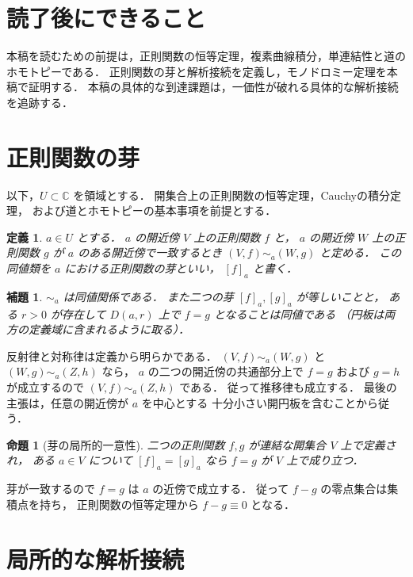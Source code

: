 \documentclass[a5paper,10pt,onecolumn]{jsarticle}
\makeatletter
\theoremstyle{mathnotetheorem}
\newtheorem{definition}[theorem]{定義}
\newtheorem{lemma}[theorem]{補題}
\newtheorem{proposition}[theorem]{命題}
\renewcommand{\proofname}{証明}
\renewenvironment{proof}[1][\proofname]{%
  \par\pushQED{\qed}\normalfont\topsep4\p@\@plus2\p@\relax
  \trivlist\item[\hskip\labelsep\bfseries #1]\ignorespaces
}{\popQED\endtrivlist\@endpefalse}
\makeatother
\begin{document}
\section*{読了後にできること}
本稿を読むための前提は，正則関数の恒等定理，複素曲線積分，単連結性と道のホモトピーである．
正則関数の芽と解析接続を定義し，モノドロミー定理を本稿で証明する．
本稿の具体的な到達課題は，一価性が破れる具体的な解析接続を追跡する．

\section{正則関数の芽}

以下，$U\subset\mathbb C$ を領域とする．
開集合上の正則関数の恒等定理，Cauchyの積分定理，
および道とホモトピーの基本事項を前提とする．

\begin{definition}
$a\in U$ とする．
$a$ の開近傍 $V$ 上の正則関数 $f$ と，
$a$ の開近傍 $W$ 上の正則関数 $g$ が
$a$ のある開近傍で一致するとき
$(V,f)\sim_a(W,g)$ と定める．
この同値類を $a$ における\emph{正則関数の芽}といい，
$[f]_a$ と書く．
\end{definition}

\begin{lemma}\label{lem:germ}
$\sim_a$ は同値関係である．
また二つの芽 $[f]_a,[g]_a$ が等しいことと，
ある $r>0$ が存在して
$D(a,r)$ 上で $f=g$ となることは同値である
（円板は両方の定義域に含まれるように取る）．
\end{lemma}
\begin{proof}
反射律と対称律は定義から明らかである．
$(V,f)\sim_a(W,g)$ と
$(W,g)\sim_a(Z,h)$ なら，
$a$ の二つの開近傍の共通部分上で
$f=g$ および $g=h$ が成立するので
$(V,f)\sim_a(Z,h)$ である．
従って推移律も成立する．
最後の主張は，任意の開近傍が $a$ を中心とする
十分小さい開円板を含むことから従う．
\end{proof}

\begin{proposition}[芽の局所的一意性]\label{prop:germ-unique}
二つの正則関数 $f,g$ が連結な開集合 $V$ 上で定義され，
ある $a\in V$ について $[f]_a=[g]_a$ なら
$f=g$ が $V$ 上で成り立つ．
\end{proposition}
\begin{proof}
芽が一致するので $f=g$ は $a$ の近傍で成立する．
従って $f-g$ の零点集合は集積点を持ち，
正則関数の恒等定理から $f-g\equiv0$ となる．
\end{proof}

\section{局所的な解析接続}
\end{document}
